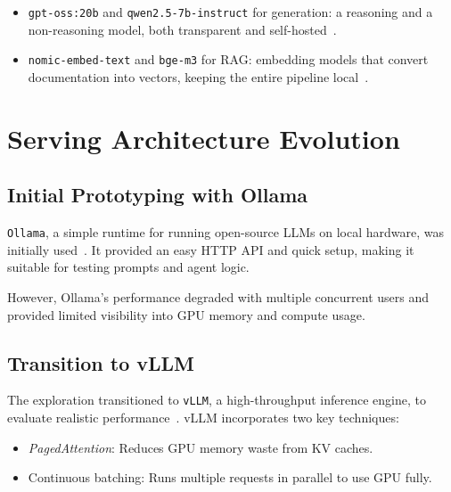 \begin{itemize}
      \item \texttt{gpt-oss:20b} and \texttt{qwen2.5-7b-instruct} for generation: a
            reasoning and a non-reasoning model, both transparent and self-hosted~\cite{openai2025gptoss,qwen2.5}.
      \item \texttt{nomic-embed-text} and \texttt{bge-m3} for RAG: embedding models that convert
            documentation into vectors, keeping the entire pipeline
            local~\cite{nomic2025embed,bgem3}.
\end{itemize}

\section{Serving Architecture Evolution}
\label{sec:LocalServing_Architecture}

\subsection{Initial Prototyping with Ollama}

\texttt{Ollama}, a simple runtime for running open-source LLMs on local
hardware, was initially used~\cite{ollama}. It provided an easy HTTP API and
quick setup, making it suitable for testing prompts and agent logic.

However, Ollama's performance degraded with multiple concurrent users and
provided limited visibility into GPU memory and compute usage.

\subsection{Transition to vLLM}

The exploration transitioned to \texttt{vLLM}, a high-throughput inference
engine, to evaluate realistic performance~\cite{kwon2023efficient}. vLLM
incorporates two key techniques:

\begin{itemize}
      \item \textit{PagedAttention}: Reduces GPU memory waste from KV caches.
      \item Continuous batching: Runs multiple requests in parallel to use GPU
            fully.
\end{itemize}

